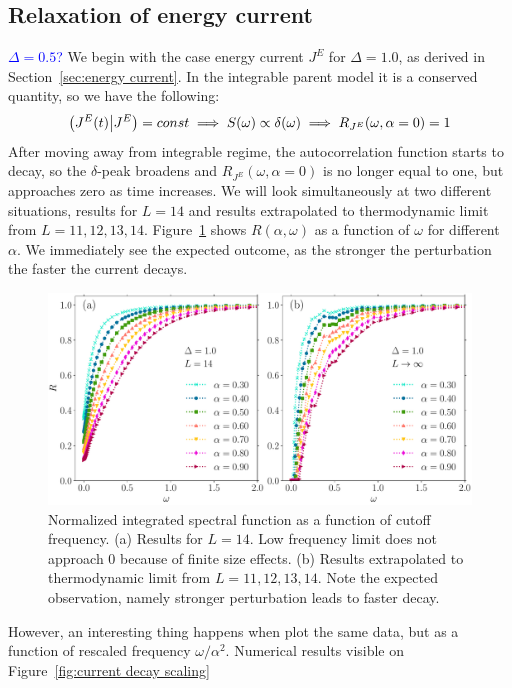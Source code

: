 \subsection{Relaxation of energy current}
\textcolor{blue}{\(\Delta=0.5\)?}
We begin with the case energy current \(J^E\) for \(\Delta = 1.0\), as derived in Section~\ref{sec:energy current}.
In the integrable parent model it is a conserved quantity, so we have the following:
\begin{equation*}
  \left(J^E(t) \middle| J^E\right) = const \implies S(\omega) \propto \delta(\omega)
  \implies R_{J^E}(\omega,\alpha=0) = 1
\end{equation*}
After moving away from integrable regime, the autocorrelation function starts to decay,
so the \(\delta\)-peak broadens and \(R_{J^E}(\omega,\alpha=0)\) is no longer equal to one,
but approaches zero as time increases. We will look simultaneously at two different situations,
results for \(L=14\) and results extrapolated to thermodynamic limit from \(L=11,12,13,14\). 
Figure~\ref{fig:current decay no scaling} shows \(R(\alpha,\omega)\) as a
function of \(\omega\) for different \(\alpha\). We immediately see the expected outcome, as the stronger
the perturbation the faster the current decays.
\begin{figure}[htbp]
  \centering
  \includegraphics[width=\textwidth]{Figures/current_no_scaling.pdf}
  \caption{Normalized integrated spectral function as a function of cutoff frequency.
  (a) Results for \(L=14\). Low frequency limit does not approach 0
  because of finite size effects. (b) Results extrapolated to thermodynamic limit from \(L=11,12,13,14\).
  Note the expected observation, namely stronger perturbation leads to faster decay.}
  \label{fig:current decay no scaling}
\end{figure}
However, an interesting thing happens when plot the same data, but as a function of rescaled
frequency \(\omega/\alpha^2\). Numerical results visible on Figure~\ref{fig:current decay scaling}
